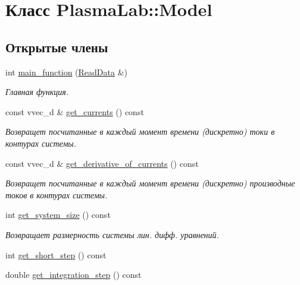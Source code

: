 \hypertarget{class_plasma_lab_1_1_model}{}\section{Класс Plasma\+Lab\+:\+:Model}
\label{class_plasma_lab_1_1_model}
\subsection*{Открытые члены}
\begin{DoxyCompactItemize}
\item 
int \hyperlink{class_plasma_lab_1_1_model_ab25a8b432256087bdd476b8aafed963c}{main\+\_\+function} (\hyperlink{class_plasma_lab_1_1_read_data}{Read\+Data} \&)
\begin{DoxyCompactList}\small\item\em Главная функция. \end{DoxyCompactList}\item 
const vvec\+\_\+d \& \hyperlink{class_plasma_lab_1_1_model_a4b116ad25a3cf812d21889f1894e3a79}{get\+\_\+currents} () const
\begin{DoxyCompactList}\small\item\em Возвращет посчитанные в каждый момент времени (дискретно) токи в контурах системы. \end{DoxyCompactList}\item 
const vvec\+\_\+d \& \hyperlink{class_plasma_lab_1_1_model_a83e3fa03423a4a56eb9754a6c097d851}{get\+\_\+derivative\+\_\+of\+\_\+currents} () const
\begin{DoxyCompactList}\small\item\em Возвращет посчитанные в каждый момент времени (дискретно) производные токов в контурах системы. \end{DoxyCompactList}\item 
int \hyperlink{class_plasma_lab_1_1_model_abc0c99cb3acd4a85ab1b4f7165c51a83}{get\+\_\+system\+\_\+size} () const
\begin{DoxyCompactList}\small\item\em Возвращает размерность системы лин. дифф. уравнений. \end{DoxyCompactList}\item 
int \hyperlink{class_plasma_lab_1_1_model_a4c338e79fdbe777204eec309cfef4717}{get\+\_\+short\+\_\+step} () const
\item 
double \hyperlink{class_plasma_lab_1_1_model_a757a74457265385a0bf8860a31c23c29}{get\+\_\+integration\+\_\+step} () const
\end{DoxyCompactItemize}



